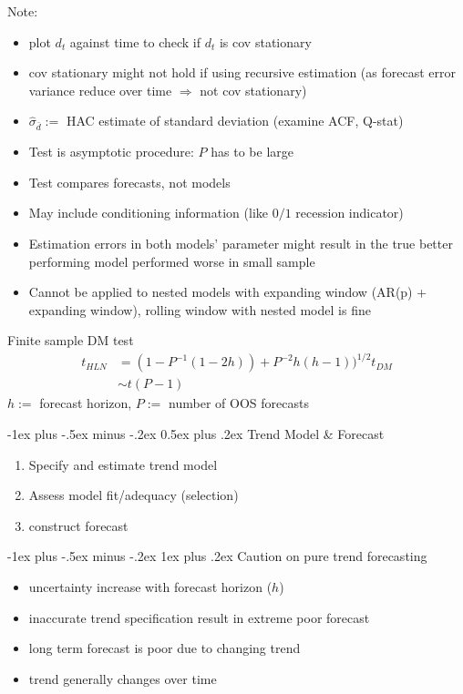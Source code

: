\documentclass[a4paper,12pt,landscape]{article}
\makeatletter
\renewcommand{\section}{\@startsection{section}{1}{0mm}%
                                {-1ex plus -.5ex minus -.2ex}%
                                {0.5ex plus .2ex}%
                                {\normalfont\large\bfseries\color{red}}}
\renewcommand{\subsubsection}{\@startsection{subsubsection}{3}{0mm}%
                                {-1ex plus -.5ex minus -.2ex}%
                                {1ex plus .2ex}%
                                {\normalfont\small\bfseries\color{violet}}}
\makeatother
\begin{document}
\begin{multicols}{3}
Note:
\begin{itemize}
    \item plot $d_t$ against time to check if
        $d_t$ is cov stationary
    \item cov stationary might not hold if using recursive
        estimation (as forecast error variance
        reduce over time $\Rightarrow$ not cov
        stationary)
    \item $\hat\sigma_{\bar d} :=$ HAC estimate of standard deviation (examine ACF, Q-stat)
    \item Test is asymptotic procedure: $P$ has to be large
    \item Test compares forecasts, not models
    \item May include conditioning information (like $0/1$ recession indicator)
    \item Estimation errors in both models'
        parameter might result in the true better
        performing model performed worse in small
        sample
    \item Cannot be applied to nested models with
        expanding window (AR(p) + expanding
        window), rolling window with nested model
        is fine
\end{itemize}

Finite sample DM test 
\begin{align*}
    t_{HLN} &= (1-P^{-1}(1-2h)) + P^{-2}h(h-1))^{1/2}t_{DM}\\
            &\sim t(P-1)
\end{align*}
$h:=$ forecast horizon, $P:=$ number of OOS forecasts


\section{Trend Model \& Forecast}

\begin{enumerate}
    \item Specify and estimate trend model
    \item Assess model fit/adequacy (selection)
    \item construct forecast
\end{enumerate}

\subsubsection{Caution on pure trend forecasting}

\begin{itemize}
    \item uncertainty increase with forecast horizon ($h$)
    \item inaccurate trend specification result in extreme poor forecast
    \item long term forecast is poor due to changing trend
    \item trend generally changes over time
\end{itemize}


\end{multicols}
\end{document}
